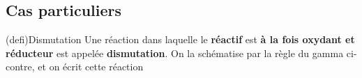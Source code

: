 \documentclass[../../main/main.tex]{subfiles}
\begin{document}
\begin{tcb*}[sidebyside, righthand ratio=.25]
\begin{center}
{    }
    \vspace{-15pt}
    \captionsetup{justification=centering}
    \label{fig:gamma}
  \end{center}
\end{tcb*}

\subsection{Cas particuliers}
\begin{tcb*}[sidebyside, righthand ratio=.3](defi){Dismutation}
  Une réaction dans laquelle le \textbf{réactif} est \textbf{à la fois oxydant
  et réducteur} est appelée \textbf{dismutation}. On la schématise par la règle
  du gamma ci-contre, et on écrit cette réaction
  \psw{
      \[
      \ce{2A = B+C}
    \]
  }
  \tcblower
  \begin{center}
\end{center}
\end{tcb*}
\end{document}
